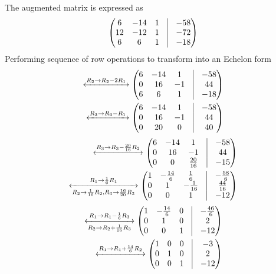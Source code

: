 \documentclass[12pt]{article}
\newcommand{\myvec}[1]{\ensuremath{\begin{pmatrix}#1\end{pmatrix}}}
\begin{document}
\begin{enumerate}
The augmented matrix is expressed as
\begin{align}
	\myvec{6 & -14 & 1 & \vrule & -58 \\ 
	      12 & -12 & 1 & \vrule & -72 \\
	       6 &  6  & 1 & \vrule & -18 
	     }  
\end{align}
Performing sequence of row operations to transform into an Echelon form
\begin{align}
	\xleftrightarrow[]{{R_2\rightarrow R_2-2R_1}}  
	\myvec{6 & -14 & 1 & \vrule & -58 \\ 
	       0 &  16 & -1 & \vrule & 44 \\
	       6 &  6  & 1 & \vrule & -18 
	     }  \\ 
	\xleftrightarrow[]{{R_3\rightarrow R_3-R_1}}  
	\myvec{6 & -14 & 1 & \vrule & -58 \\ 
	       0 &  16 & -1 & \vrule & 44 \\
	       0 &  20  & 0 & \vrule & 40 
	     }  
\end{align}
\begin{align}
	\xleftrightarrow[]{{R_3\rightarrow R_3-\frac{20}{16}R_2}}  
	\myvec{6 & -14 & 1 & \vrule & -58 \\ 
	       0 &  16 & -1 & \vrule & 44 \\
	       0 &  0  &  \frac{20}{16} & \vrule & -15 
	     }  \\ 
	\xleftrightarrow[R_2\rightarrow \frac{1}{16}R_2 \text{,} R_3\rightarrow \frac{16}{20}R_3]{{R_1\rightarrow \frac{1}{6}R_1}}  
	\myvec{1 & -\frac{14}{6} & \frac{1}{6} & \vrule & -\frac{58}{6} \\ 
	       0 &  1 & -\frac{1}{16} & \vrule & \frac{44}{16} \\
	       0 &  0  &  1  & \vrule & -12 
	     }   
\end{align}
\begin{align}
	\xleftrightarrow[R_2\rightarrow R_2+\frac{1}{16}R_3]{{R_1\rightarrow R_1-\frac{1}{6}R_3}}  
	\myvec{1 & -\frac{14}{6} & 0 & \vrule & -\frac{46}{6} \\ 
	       0 &  1 & 0 & \vrule & 2 \\
	       0 &  0  &  1  & \vrule & -12 
	     }  \\ 
	\label{eq:Solution}
	\xleftrightarrow[]{{R_1\rightarrow R_1+\frac{14}{6}R_2}}  
	\myvec{1 &  0 & 0 & \vrule & -3\\ 
	       0 &  1 & 0 & \vrule & 2 \\
	       0 &  0 & 1 & \vrule & -12 
	     }  
\end{align}

\end{enumerate}
\end{document}
